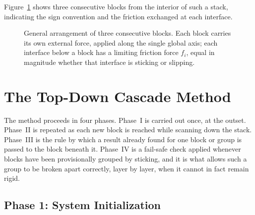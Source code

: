 \documentclass[11pt,a4paper]{article}
\begin{document}
Figure~\ref{fig:schematic} shows three consecutive blocks from the interior of such a stack, indicating the sign convention and the friction exchanged at each interface.

\begin{figure}[h]
\centering
{}
\caption{General arrangement of three consecutive blocks. Each block carries its own external force, applied along the single global axis; each interface below a block has a limiting friction force $f_i$, equal in magnitude whether that interface is sticking or slipping.}
\label{fig:schematic}
\end{figure}

\section{The Top-Down Cascade Method}
\label{sec:method}

The method proceeds in four phases. Phase~I is carried out once, at the outset. Phase~II is repeated as each new block is reached while scanning down the stack. Phase~III is the rule by which a result already found for one block or group is passed to the block beneath it. Phase~IV is a fail-safe check applied whenever blocks have been provisionally grouped by sticking, and it is what allows such a group to be broken apart correctly, layer by layer, when it cannot in fact remain rigid.

\subsection{Phase 1: System Initialization}
\end{document}
